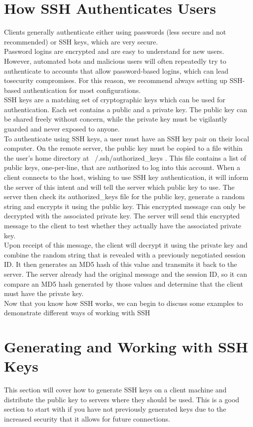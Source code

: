 \documentclass[12pt]{report}
\begin{document}
\section{How SSH Authenticates Users}
Clients generally authenticate either using passwords (less secure and not
recommended) or SSH keys, which are very secure.\\
Password logins are encrypted and are easy to understand for new users.
However, automated bots and malicious users will often repeatedly try to
authenticate to accounts that allow password-based logins, which can lead tosecurity compromises. For this reason, we recommend always setting up SSH-
based authentication for most configurations.\\
SSH keys are a matching set of cryptographic keys which can be used for
authentication. Each set contains a public and a private key. The public key can
be shared freely without concern, while the private key must be vigilantly
guarded and never exposed to anyone.\\
To authenticate using SSH keys, a user must have an SSH key pair on their local
computer. On the remote server, the public key must be copied to a file within
the user's home directory at ~/.ssh/authorized\_keys . This file contains a list of
public keys, one-per-line, that are authorized to log into this account.
When a client connects to the host, wishing to use SSH key authentication, it
will inform the server of this intent and will tell the server which public key to
use. The server then check its authorized\_keys file for the public key, generate
a random string and encrypts it using the public key. This encrypted message
can only be decrypted with the associated private key. The server will send this
encrypted message to the client to test whether they actually have the
associated private key.\\
Upon receipt of this message, the client will decrypt it using the private key
and combine the random string that is revealed with a previously negotiated
session ID. It then generates an MD5 hash of this value and transmits it back to
the server. The server already had the original message and the session ID, so
it can compare an MD5 hash generated by those values and determine that the
client must have the private key.\\
Now that you know how SSH works, we can begin to discuss some examples to
demonstrate different ways of working with SSH

\section{Generating and Working with SSH Keys}
This section will cover how to generate SSH keys on a client machine and
distribute the public key to servers where they should be used. This is a good
section to start with if you have not previously generated keys due to the
increased security that it allows for future connections.
\end{document}
